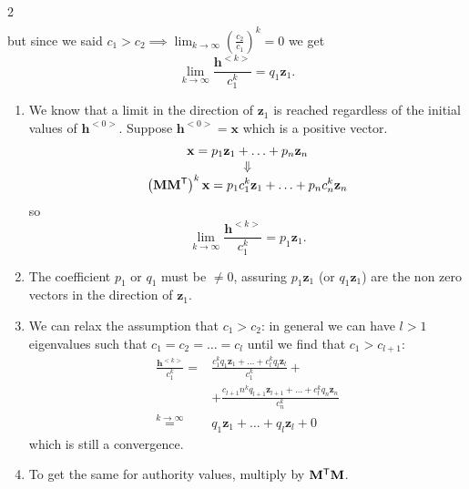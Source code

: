 \documentclass[a4paper,9pt]{extarticle}
\begin{document}
\begin{multicols*}{2}
\begin{align*}
		\end{align*} but since we said $c_{1}>c_{2}\implies\lim_{k\to\infty}\left(\frac{c_{2}}{c_{1}}\right)^{k}=0$ we get
		\begin{equation*}
			\lim_{k\to\infty}\frac{	\mathbf{h}^{<k>}}{c_{1}^{k}}=q_{1}\mathbf{z}_{1}.
		\end{equation*}
		\begin{riquadro}[Extension]
			\begin{enumerate}
				\item We know that a limit in the direction of $\mathbf{z}_{1}$ is reached regardless of the initial values of $\mathbf{h}^{<0>}$. Suppose $\mathbf{h}^{<0>}=\mathbf{x}$ which is a positive vector.
				\begin{equation*}
					\begin{array}{>{\displaystyle}c}
						\mathbf{x}=p_{1}\mathbf{z}_{1}+\ldots+p_{n}\mathbf{z}_{n}\\
						\Downarrow\\
						\left(\mathbf{M}\trans{\mathbf{M}}\right)^{k}\mathbf{x}=p_{1}c_{1}^{k}\mathbf{z}_{1}+\ldots+p_{n}c_{n}^{k}\mathbf{z}_{n}
					\end{array}
				\end{equation*}
				so
				\begin{equation*}
					\lim_{k\to\infty}\frac{	\mathbf{h}^{<k>}}{c_{1}^{k}}=p_{1}\mathbf{z}_{1}.
				\end{equation*}
				\item The coefficient $p_{1}$ or $q_{1}$ must be $\neq0$, assuring $p_{1}\mathbf{z}_{1}$ (or $q_{1}\mathbf{z}_{1}$) are the non zero vectors in the direction of $\mathbf{z}_{1}$.
				\item We can relax the assumption that $c_{1}>c_{2}$: in general we can have $l>1$ eigenvalues such that $c_{1}=c_{2}=\ldots=c_{l}$ until we find that $c_{1}>c_{l+1}$:
				\begin{align*}
					\frac{\mathbf{h}^{<k>}}{c_{1}^{k}}=&\frac{c^{k}_{1}q_{1}\mathbf{z}_{1}+\ldots+c^{k}_{l}q_{l}\mathbf{z}_{l}}{c^{k}_{1}}+\\
					&+\frac{c_{l+1}n^{k}q_{l+1}\mathbf{z}_{l+1}+\ldots+c^{k}_{l}q_{n}\mathbf{z}_{n}}{c^{k}_{n}}\\
					\overset{k\to\infty}{=}&q_{1}\mathbf{z}_{1}+\ldots+q_{l}\mathbf{z}_{l}+0
				\end{align*}
				which is still a convergence.
				\item To get the same for authority values, multiply by ${\mathbf{M}}^{\mathsf{T}}\mathbf{M}$.
			\end{enumerate}
		\end{riquadro}

\end{multicols*}
\end{document}
